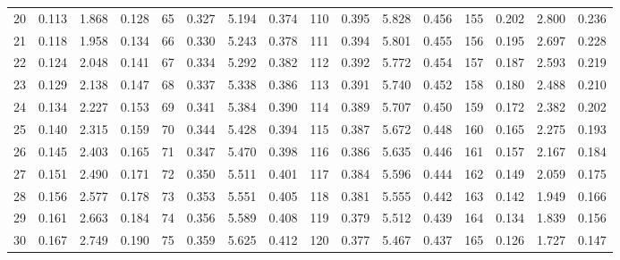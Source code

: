 \begin{table}[!h]
{\begin{tabular}{rrrr|rrrr|rrrr|rrrr}
 20 & \tiny{  0.113} &   1.868 & \tiny{  0.128} &  65 & \tiny{  0.327} &   5.194 & \tiny{  0.374} & 110 & \tiny{  0.395} &   5.828 & \tiny{  0.456} & 155 & \tiny{  0.202} &   2.800 & \tiny{  0.236}\\
 21 & \tiny{  0.118} &   1.958 & \tiny{  0.134} &  66 & \tiny{  0.330} &   5.243 & \tiny{  0.378} & 111 & \tiny{  0.394} &   5.801 & \tiny{  0.455} & 156 & \tiny{  0.195} &   2.697 & \tiny{  0.228}\\
 22 & \tiny{  0.124} &   2.048 & \tiny{  0.141} &  67 & \tiny{  0.334} &   5.292 & \tiny{  0.382} & 112 & \tiny{  0.392} &   5.772 & \tiny{  0.454} & 157 & \tiny{  0.187} &   2.593 & \tiny{  0.219}\\
 23 & \tiny{  0.129} &   2.138 & \tiny{  0.147} &  68 & \tiny{  0.337} &   5.338 & \tiny{  0.386} & 113 & \tiny{  0.391} &   5.740 & \tiny{  0.452} & 158 & \tiny{  0.180} &   2.488 & \tiny{  0.210}\\
 24 & \tiny{  0.134} &   2.227 & \tiny{  0.153} &  69 & \tiny{  0.341} &   5.384 & \tiny{  0.390} & 114 & \tiny{  0.389} &   5.707 & \tiny{  0.450} & 159 & \tiny{  0.172} &   2.382 & \tiny{  0.202}\\
 25 & \tiny{  0.140} &   2.315 & \tiny{  0.159} &  70 & \tiny{  0.344} &   5.428 & \tiny{  0.394} & 115 & \tiny{  0.387} &   5.672 & \tiny{  0.448} & 160 & \tiny{  0.165} &   2.275 & \tiny{  0.193}\\
 26 & \tiny{  0.145} &   2.403 & \tiny{  0.165} &  71 & \tiny{  0.347} &   5.470 & \tiny{  0.398} & 116 & \tiny{  0.386} &   5.635 & \tiny{  0.446} & 161 & \tiny{  0.157} &   2.167 & \tiny{  0.184}\\
 27 & \tiny{  0.151} &   2.490 & \tiny{  0.171} &  72 & \tiny{  0.350} &   5.511 & \tiny{  0.401} & 117 & \tiny{  0.384} &   5.596 & \tiny{  0.444} & 162 & \tiny{  0.149} &   2.059 & \tiny{  0.175}\\
 28 & \tiny{  0.156} &   2.577 & \tiny{  0.178} &  73 & \tiny{  0.353} &   5.551 & \tiny{  0.405} & 118 & \tiny{  0.381} &   5.555 & \tiny{  0.442} & 163 & \tiny{  0.142} &   1.949 & \tiny{  0.166}\\
 29 & \tiny{  0.161} &   2.663 & \tiny{  0.184} &  74 & \tiny{  0.356} &   5.589 & \tiny{  0.408} & 119 & \tiny{  0.379} &   5.512 & \tiny{  0.439} & 164 & \tiny{  0.134} &   1.839 & \tiny{  0.156}\\
 30 & \tiny{  0.167} &   2.749 & \tiny{  0.190} &  75 & \tiny{  0.359} &   5.625 & \tiny{  0.412} & 120 & \tiny{  0.377} &   5.467 & \tiny{  0.437} & 165 & \tiny{  0.126} &   1.727 & \tiny{  0.147}\\

\end{tabular}}
\end{table}
